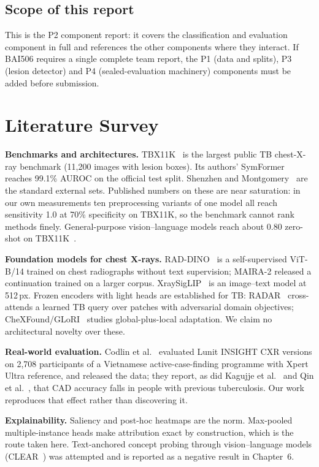 \documentclass[12pt,a4paper]{report}
\begin{document}
\section{Scope of this report}
This is the P2 component report: it covers the classification and evaluation component in full and references the other components where they interact. If BAI506 requires a single complete team report, the P1 (data and splits), P3 (lesion detector) and P4 (sealed-evaluation machinery) components must be added before submission.

\chapter{Literature Survey}
\textbf{Benchmarks and architectures.} TBX11K~\cite{liu2024} is the largest public TB chest-X-ray benchmark (11,200 images with lesion boxes). Its authors' SymFormer reaches 99.1\% AUROC on the official test split. Shenzhen and Montgomery~\cite{jaeger2014} are the standard external sets. Published numbers on these are near saturation: in our own measurements ten preprocessing variants of one model all reach sensitivity 1.0 at 70\% specificity on TBX11K, so the benchmark cannot rank methods finely. General-purpose vision--language models reach about 0.80 zero-shot on TBX11K~\cite{akhtar2026}.

\textbf{Foundation models for chest X-rays.} RAD-DINO~\cite{perezgarcia2025} is a self-supervised ViT-B/14 trained on chest radiographs without text supervision; MAIRA-2 released a continuation trained on a larger corpus. XraySigLIP~\cite{xraysiglip} is an image--text model at 512\,px. Frozen encoders with light heads are established for TB: RADAR~\cite{rege2026} cross-attends a learned TB query over patches with adversarial domain objectives; CheXFound/GLoRI~\cite{yang2025} studies global-plus-local adaptation. We claim no architectural novelty over these.

\textbf{Real-world evaluation.} Codlin et al.~\cite{codlin2025} evaluated Lunit INSIGHT CXR versions on 2,708 participants of a Vietnamese active-case-finding programme with Xpert Ultra reference, and released the data; they report, as did Kagujje et al.~\cite{kagujje2023} and Qin et al.~\cite{qin2024}, that CAD accuracy falls in people with previous tuberculosis. Our work reproduces that effect rather than discovering it.

\textbf{Explainability.} Saliency and post-hoc heatmaps are the norm. Max-pooled multiple-instance heads make attribution exact by construction, which is the route taken here. Text-anchored concept probing through vision--language models (CLEAR~\cite{han2026}) was attempted and is reported as a negative result in Chapter~6.
\end{document}
